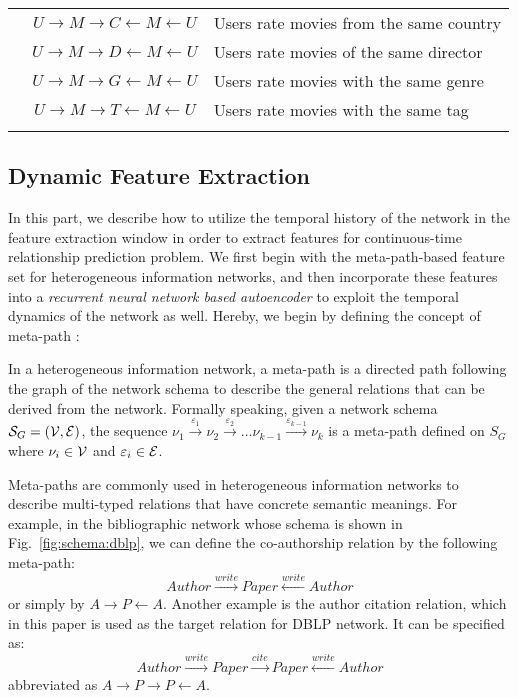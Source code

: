 \begin{table}[t]
\begin{tabular} {c c l}
		& $U\rightarrow M\rightarrow C\leftarrow M\leftarrow U$ & Users rate movies from the same country\\
		& $U\rightarrow M\rightarrow D\leftarrow M\leftarrow U$ & Users rate movies of the same director\\
		& $U\rightarrow M\rightarrow G\leftarrow M\leftarrow U$ & Users rate movies with the same genre\\
		& $U\rightarrow M\rightarrow T\leftarrow M\leftarrow U$ & Users rate movies with the same tag\\
		&&\\
		\bottomrule
	\end{tabular}
\end{table}

\subsection{Dynamic Feature Extraction}
In this part, we describe how to utilize the temporal history of the network in the feature extraction window in order to extract features for continuous-time relationship prediction problem. We first begin with the meta-path-based feature set for heterogeneous information networks, and then incorporate these features into a \emph{recurrent neural network based autoencoder} to exploit the temporal dynamics of the network as well. Hereby, we begin by defining the concept of meta-path \cite{sun2011pathsim}:

\begin{definition}
	In a heterogeneous information network, a meta-path is a directed path following the graph of the network schema to describe the general relations that can be derived from the network. Formally speaking, given a network schema $\mathcal{S}_G=(\mathcal{V}, \mathcal{E})$, the sequence $\nu_1\xrightarrow{\varepsilon_1}\nu_2\xrightarrow{\varepsilon_2}\dots\nu_{k-1}\xrightarrow{\varepsilon_{k-1}}\nu_k$ is a meta-path defined on $S_G$ where $\nu_i\in \mathcal{V}$ and $\varepsilon_i\in \mathcal{E}$.
\end{definition} 

Meta-paths are commonly used in heterogeneous information networks to describe multi-typed relations that have concrete semantic meanings. For example, in the bibliographic network whose schema is shown in Fig.~\ref{fig:schema:dblp}, we can define the co-authorship relation by the following meta-path:
\[Author\xrightarrow{write}Paper\xleftarrow{write}Author\]
or simply by $A\rightarrow P\leftarrow A$. Another example is the author citation relation, which in this paper is used as the target relation for DBLP network. It can be specified as:
\[Author\xrightarrow{write}Paper\xrightarrow{cite}Paper\xleftarrow{write}Author\]
abbreviated as $A\rightarrow P\rightarrow P\leftarrow A$.

